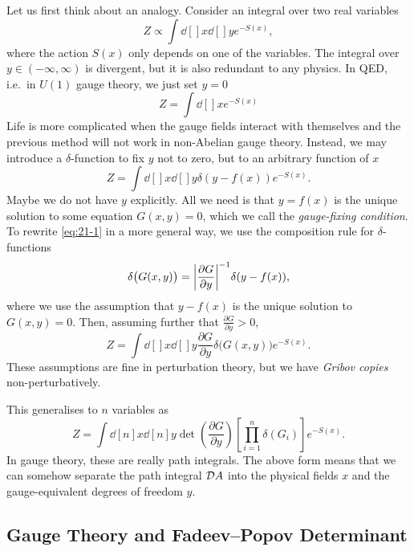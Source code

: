Let us first think about an analogy. Consider an integral over two real variables
\begin{equation}
  Z \propto \int \dd[]{x} \dd[]{y} e^{-S(x)},
\end{equation}
where the action $S(x)$ only depends on one of the variables.
The integral over $y \in (-\infty, \infty)$ is divergent, but it is also redundant to any physics.
In QED, i.e.~in $U(1)$ gauge theory, we just set $y = 0$
\begin{equation}
  Z = \int \dd[]{x} e^{- S(x)}
\end{equation}
Life is more complicated when the gauge fields interact with themselves and the previous method will not work in non-Abelian gauge theory.
Instead, we may introduce a $\delta$-function to fix $y$ not to zero, but to an arbitrary function of $x$
\begin{equation}
  \label{eq:21-1}
  Z = \int \dd[]{x} \dd[]{y} \delta(y - f(x)) e^{-S(x)}.
\end{equation}
Maybe we do not have $y$ explicitly. All we need is that $y = f(x)$ is the unique solution to some equation $G(x, y) = 0$, which we call the \emph{gauge-fixing condition}.
To rewrite \eqref{eq:21-1} in a more general way, we use the composition rule for $\delta$-functions
\begin{equation}
  \delta\bigl(G(x, y)\bigr) = \abs{\frac{\partial G}{\partial y}}^{-1} \delta(y - f(x)),
\end{equation}
where we use the assumption that $y - f(x)$ is the unique solution to $G(x, y) = 0$.
Then, assuming further that $\frac{\partial G}{\partial y} > 0$, 
\begin{equation}
  Z = \int \dd[]{x} \dd[]{y} \frac{\partial G}{\partial y} \delta\bigl(G(x, y)\bigr) e^{-S(x)}.
\end{equation}
These assumptions are fine in perturbation theory, but we have \emph{Gribov copies} non-perturbatively.

This generalises to $n$ variables as
\begin{equation}
  Z = \int \dd[n]{x} \dd[n]{y} \det(\frac{\partial G}{\partial y}) \left[ \prod_{i = 1}^n \delta(G_i) \right] e^{-S(x)}.
\end{equation}
In gauge theory, these are really path integrals. The above form means that we can somehow separate the path integral $\mathop{\mathcal{D} A}$ into the physical fields $x$ and the gauge-equivalent degrees of freedom $y$.

\subsection{Gauge Theory and Fadeev--Popov Determinant}%
\label{sub:gauge_theory_and_fp_determinant}

